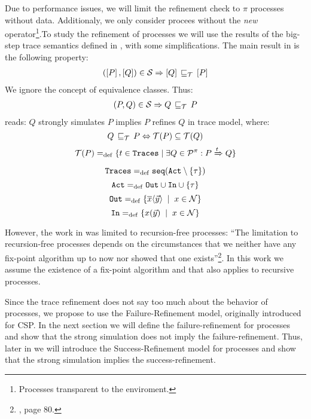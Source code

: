 Due to performance issues, we will limit the refinement check to $\pi$ processes without data. Additionaly, we only consider procees without the \textit{new} operator\footnote{Processes transparent to the enviroment.}.To study the refinement of \picalc{} processes we will use the results of the big-step trace semantics defined in \cite{gieseking}, with some simplifications. 
The main result in \cite{gieseking} is the following property:
\begin{align}
    (\ec{P},\ec{Q})\in{}\simu \Rightarrow \ec{Q} \refi \ec{P} \label{property1}
\end{align}
We ignore the concept of equivalence classes. Thus:
\begin{align}
    (P,Q)\in{}\simu \Rightarrow Q \refi P
\label{property2}
\end{align}
 reads: $Q$ strongly simulates $P$ implies $P$ refines $Q$ in trace model, where:
\[Q\refi P \Leftrightarrow \Traces[P]\subseteq\Traces[Q]\]
\[\Traces[P] \define \{t\in \tr \mid \exists Q\in\procs: P \bigstep{t} Q\}\]
\[\tr \define \seqset{\actions\setminus\set{\tau}}\]
\[\actions\define\outA\cup\inA\cup\set{\tau}\]
\[\outA\define\set[x\in\names]{\out{x}{\vec{y}}}\]
\[\inA\define\set[x\in\names]{\inp{x}{\vec{y}}}\]

However, the work in \cite{gieseking} was limited to recursion-free processes: ``The limitation to recursion-free processes depends on the circumstances that we neither have any fix-point algorithm up to now nor showed that one exists''\footnote{\cite{gieseking}, page $80$.}. In this work we assume the existence of a fix-point algorithm and that  also applies to recursive processes.


Since the trace refinement does not say too much about the behavior of processes, we propose to use the Failure-Refinement model, originally introduced for CSP. In the next section we will define the failure-refinement for \picalc{} processes and show that the strong simulation does not imply the failure-refinement. Thus, later in  we will introduce the Success-Refinement model for \picalc{} processes and show that the strong simulation implies the success-refinement.